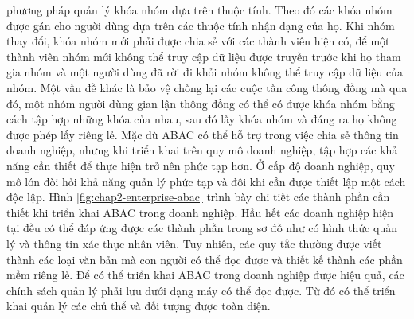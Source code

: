 phương pháp quản lý khóa nhóm dựa trên thuộc tính. Theo đó các khóa nhóm được gán
cho người dùng dựa trên các thuộc tính nhận dạng của họ. 
\indent Khi nhóm thay đổi, khóa nhóm mới phải được chia sẻ với các thành viên hiện có,
để một thành viên nhóm mới không thể truy cập dữ liệu được truyền trước khi họ tham
gia nhóm và một người dùng đã rời đi khỏi nhóm không thể truy cập dữ liệu của nhóm.
Một vấn đề khác là bảo vệ chống lại các cuộc tấn công thông đồng mà qua đó, một nhóm người dùng gian lận thông đồng có thể có được khóa nhóm bằng cách tập hợp những
khóa của nhau, sau đó lấy khóa nhóm và đáng ra họ không được phép lấy riêng lẻ. 
\indent Mặc dù ABAC có thể hỗ trợ trong việc chia sẻ thông tin doanh nghiệp, nhưng khi
triển khai trên quy mô doanh nghiệp, tập hợp các khả năng cần thiết để thực hiện trở nên
phức tạp hơn. Ở cấp độ doanh nghiệp, quy mô lớn đòi hỏi khả năng quản lý phức tạp và
đôi khi cần được thiết lập một cách độc lập. Hình \ref{fig:chap2-enterprise-abac} trình bày chi tiết các thành phần cần thiết khi triển khai ABAC trong
doanh nghiệp. Hầu hết các doanh nghiệp hiện tại đều có thể đáp ứng được các thành
phần trong sơ đồ như có hình thức quản lý và thông tin xác thực nhân viên. Tuy nhiên,
các quy tắc thường được viết thành các loại văn bản mà con người có thể đọc được và
thiết kế thành các phần mềm riêng lẻ. Để có thể triển khai ABAC trong doanh nghiệp
được hiệu quả, các chính sách quản lý phải lưu dưới dạng máy có thể đọc được. Từ đó
có thể triển khai quản lý các chủ thể và đối tượng được toàn diện.
